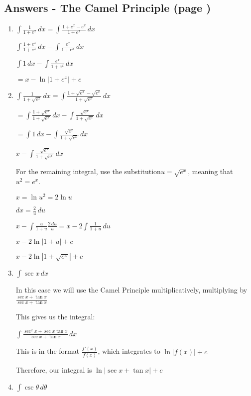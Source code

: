 \documentclass[../main.tex]{subfiles}
\begin{document}
\subsection*{Answers - The Camel Principle (page \pageref{Camel Principle})}
\label{Camel principle answers}
\begin{enumerate}
    \item 
    \(\int \frac{1}{1+e^x}\,dx=\int \frac{1+e^x-e^x}{1+e^x}\,dx\)
    
    \(\int \frac{1+e^x}{1+e^x}\,dx-\int \frac{e^x}{1+e^x}\,dx\)

    \(\int 1\,dx-\int \frac{e^x}{1+e^x}\,dx\)

    \(=x-\ln{|1+e^x|}+c\)
    
    \item 
    \(\int \frac{1}{1+\sqrt{e^x}}\,dx=\int \frac{1+\sqrt{e^x}-\sqrt{e^x}}{1+\sqrt{e^x}}\,dx\)

    \(=\int \frac{1+\sqrt{e^x}}{1+\sqrt{e^x}}\,dx-\int \frac{\sqrt{e^x}}{1+\sqrt{e^x}}\,dx\)

    \(=\int 1\,dx-\int \frac{\sqrt{e^x}}{1+\sqrt{e^x}}\,dx\)

    \(x-\int \frac{\sqrt{e^x}}{1+\sqrt{e^x}}\,dx\)

    For the remaining integral, use the substitution\(u=\sqrt{e^x}\), meaning that \(u^2=e^x\).

    \(x=\ln{u^2}=2\ln{u}\)

    \(dx=\frac{2}{u}\,du\)

    \(x-\int \frac{u}{1+u}\frac{2\,du}{u}=x-2\int \frac{1}{1+u}\,du\)

    \(x-2\ln{|1+u|}+c\)

    \(x-2\ln{|1+\sqrt{e^x}|}+c\)
    
    \item 
    \(\int \sec{x}\,dx\)

    In this case we will use the Camel Principle multiplicatively, multiplying by \(\frac{\sec{x}+\tan{x}}{\sec{x}+\tan{x}}\)

    This gives us the integral:

    \(\int \frac{\sec^2{x}+\sec{x}\tan{x}}{\sec{x}+\tan{x}}\,dx\)

    This is in the format \(\frac{f'(x)}{f(x)}\), which integrates to \(\ln{|f(x)|}+c\)

    Therefore, our integral is \(\ln{|\sec{x}+\tan{x}|}+c\)

    \item 
    \(\int \csc{\theta}\,d\theta\)


\end{enumerate}
\end{document}
